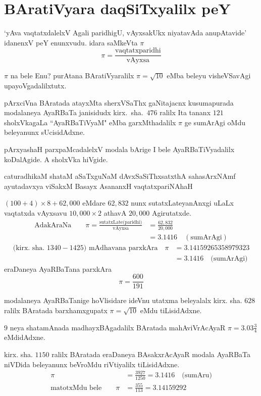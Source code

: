 \chapter{BAratiVyara daqSiTxyalilx peY}

`yAva vaqtatxdalelxV Agali paridhigU, vAyxsakUkx niyatavAda anupAtavide' idanenxV peY enunxvudu. idara saMkeVta $\pi$
$$
\pi = \frac{\text{vaqtatxparidhi}}{\text{vAyxsa}}
$$

$\pi$ na bele Enu? purAtana BAratiVyaralilx $\pi = \sqrt{10}$ eMba beleyu visheVSa\-vAgi upayoVgadalilxtutx.

pArxciVna BAratada atayxMta sherxVSaThx gaNitajacnx kusumapurada modalaneya AyaRBaTa janisidudx kirx.~sha.\ $476$ ralilx Ita tananx $121$ sholxVkagaLa ``AyaRBaTiVyaM" eMba garxMthadalilx $\pi$ ge sumArAgi oMdu beleyanunx sUcisidAdxne.

pArxyashaH parxpaMcadalelxV modala bArige I bele AyaRBaTiVyadalilx koDa\-lAgide. A sholxVka hiVgide.

\begin{center}
caturadhikaM shataM aSaTxguNaM dAvxSaSiThxsatxthA sahasArxNAmf\\
ayutadavxya viSakxM Basayx AsananxH vaqtatxpariNAhaH
\end{center} 
 
$(100+4)\times 8 + 62,000$ eMdare $62,832$ nunx sutatxLateyanAnxgi uLaLx vaqtatxda vAyxsavu $10,000\times 2$ athavA $20,000$ Agirutatxde.
\begin{align*}
\text{AdakAraNa}\qquad \pi = \frac{\text{sutatxLate(paridhi)}}{\text{vAyxsa}} &= \frac{62,832}{20,000}\\
&= 3.1416\quad(\text{sumArAgi}) 
\end{align*} 
\begin{align*}
\text{(kirx.~sha.\ $1340-1425$) mAdhavana parxkAra} \quad\pi &= 3.14159265358979323\\
&=3.1416 \quad\text{(sumArAgi)}  
\end{align*}
eraDaneya AyaRBaTana parxkAra
$$
\pi = \frac{600}{191}
$$

modalaneya AyaRBaTanige hoVlisidare ideVnu utatxma beleyalalx kirx. sha. $628$ ralilx BAratada barxhamxgupatx $\pi = \sqrt{10}$ eMdu tiLisidAdxne.

$9$ neya shatamAnada madhayxBAgadalilx BAratada mahAviVrAcAyaR $\pi = 3.03\frac{3}{4}$ eMdidAdxne.

kirx. sha. $1150$ ralilx BAratada eraDaneya BAsakxrAcAyaR modala AyaRBaTa niVDida beleyanunx beVroMdu riVtiyalilx tiLisidAdxne.
\begin{align*}
\pi &= \frac{3927}{1250} = 3.1416 \quad\text{(sumAru)}\\
\text{matotxMdu bele}\qquad \pi &= \frac{355}{113} = 3.14159292
\end{align*}


